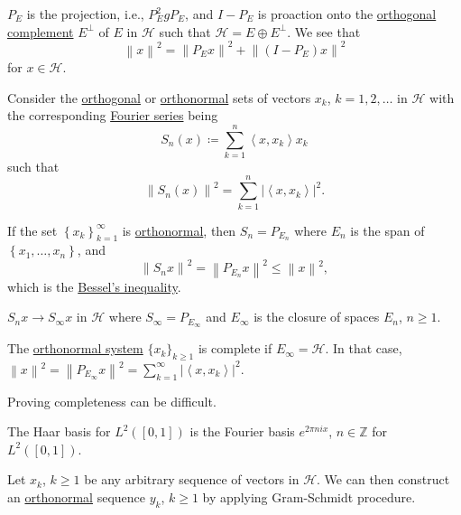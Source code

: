 \begin{remark}
	\(P_E\) is the projection, i.e., \(P_E ^{2} g P_E\), and \(I-P_E\) is proaction onto the \hyperref[def:orthogonal-complement]{orthogonal complement} \(E^\perp\) of \(E\) in \(\mathcal{H} \) such that \(\mathcal{H} = E \oplus E^{\perp} \). We see that
	\[
		\left\lVert x\right\rVert ^{2} = \left\lVert P_E x\right\rVert ^{2} + \left\lVert (I - P_E)x\right\rVert ^{2}
	\]
	for \(x\in \mathcal{H} \).
\end{remark}

Consider the \hyperref[def:orthogonal-system]{orthogonal} or \hyperref[def:orthonormal-system]{orthonormal} sets of vectors \(x_k\), \(k = 1, 2, \ldots  \) in \(\mathcal{H} \) with the corresponding \hyperref[def:Fourier-series]{Fourier series} being
\[
	S_n(x) \coloneqq \sum_{k=1} ^n \left\langle x, x_k \right\rangle x_k
\]
such that
\[
	\left\lVert S_n(x)\right\rVert ^{2} = \sum_{k=1}^n \left\vert \left\langle x, x_k \right\rangle  \right\vert ^{2}.
\]

If the set \(\left\{ x_k \right\} _{k=1}^{\infty} \) is \hyperref[def:orthonormal-system]{orthonormal}, then \(S_n = P_{E_n}\) where \(E_n\) is the span of \(\left\{ x_1, \ldots , x_n  \right\} \), and
\[
	\left\lVert S_n x\right\rVert ^{2} = \left\lVert P_{E_n}x\right\rVert ^{2} \leq \left\lVert x\right\rVert ^{2},
\]
which is the \hyperref[thm:Bessel-ineq]{Bessel's inequality}.

\begin{remark}
	\(S_n x \to S_\infty x\) in \(\mathcal{H} \) where \(S_\infty = P_{E_\infty }\) and \(E_\infty \) is the closure of spaces \(E_n\), \(n \geq 1\).
\end{remark}

The \hyperref[def:orthonormal-system]{orthonormal system} \(\{x_k\}_{k \geq 1}\) is complete if \(E_\infty = \mathcal{H}\). In that case, \(\left\lVert x\right\rVert ^{2} = \left\lVert P_{E_\infty }x\right\rVert ^{2} = \sum_{k=1}^{\infty} \left\vert \left\langle x, x_k \right\rangle  \right\vert ^{2} \).

\begin{remark}
	Proving completeness can be difficult.
\end{remark}

\begin{eg}
	The Haar basis for \(L^2([0, 1])\) is the Fourier basis \(e^{2\pi ni x}\), \(n \in \mathbb{Z } \) for \(L^2([0, 1])\).
\end{eg}
\begin{explanation}
	Let \(x_k\), \(k \geq 1\) be any arbitrary sequence of vectors in \(\mathcal{H} \). We can then construct an \hyperref[def:orthonormal-system]{orthonormal} sequence \(y_k\), \(k \geq 1\) by applying Gram-Schmidt procedure.
\end{explanation}

